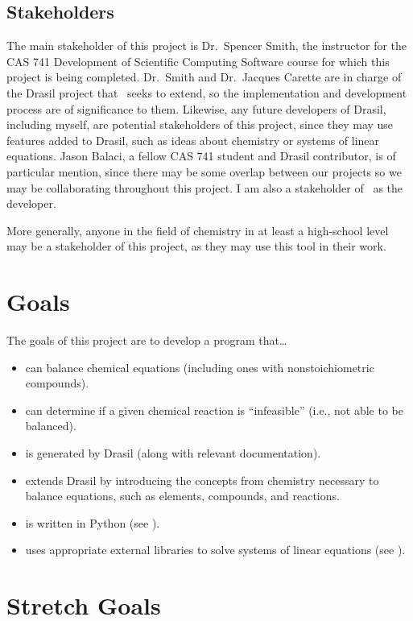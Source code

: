 \documentclass{article}
\begin{document}
\subsection{Stakeholders} \label{stkhlds}
The main stakeholder of this project is Dr.~Spencer Smith, the instructor for
the CAS 741 Development of Scientific Computing Software course for which this
project is being completed. Dr.~Smith and Dr.~Jacques Carette are in charge of
the Drasil project that \progname~seeks to extend, so the implementation and
development process are of significance to them. Likewise, any future
developers of Drasil, including myself, are
potential stakeholders of this project, since they may use features added to
Drasil, such as ideas about chemistry or systems of linear equations. Jason
Balaci, a fellow CAS 741 student and Drasil contributor, is of particular 
mention, since
there may be some overlap between our projects so we may be collaborating
throughout this project. I am also a stakeholder of \progname~as the
developer.

More generally, anyone in the field of chemistry in at least a high-school level
may be a stakeholder of this project, as they may use this tool in their work.

\section{Goals}

The goals of this project are to develop a program that\dots

\begin{itemize}
    \item can balance chemical equations (including ones with nonstoichiometric
    compounds).
    \item can determine if a given chemical reaction is ``infeasible'' (i.e.,
    not able to be balanced).
    \item is generated by Drasil (along with relevant documentation).
    \item extends Drasil by introducing the concepts from chemistry necessary
    to balance equations, such as elements, compounds, and reactions.
    \item is written in Python (see ).
    \item uses appropriate external libraries to
    solve systems of linear equations (see \cite[Ch. 4]{chen_solving_2022}).
\end{itemize}

\section{Stretch Goals}
\end{document}
